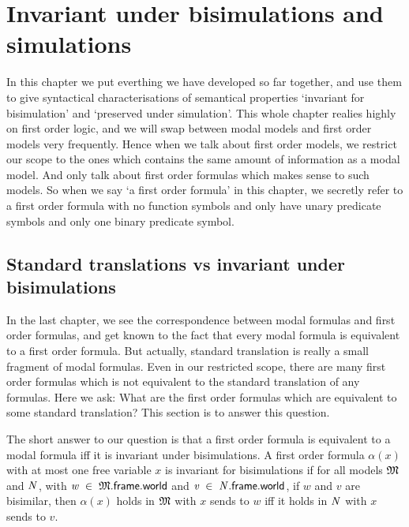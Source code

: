 \documentclass[letterpaper]{article}
\renewcommand{\HOLinline}[1]{\ensuremath{#1}}
\begin{document}
\section{Invariant under bisimulations and simulations}

In this chapter we put everthing we have developed so far together, and use them to give syntactical characterisations of semantical properties `invariant for bisimulation' and `preserved under simulation'. This whole chapter realies highly on first order logic, and we will swap between modal models and first order models very frequently. Hence when we talk about first order models, we restrict our scope to the ones which contains the same amount of information as a modal model. And only talk about first order formulas which makes sense to such models. So when we say `a first order formula' in this chapter, we secretly refer to a first order formula with no function symbols and only have unary predicate symbols and only one binary predicate symbol.

\subsection{Standard translations vs invariant under bisimulations}

In the last chapter, we see the correspondence between modal formulas and first order formulas, and get known to the fact that every modal formula is equivalent to a first order formula. But actually, standard translation is really a small fragment of modal formulas. Even in our restricted scope, there are many first order formulas which is not equivalent to the standard translation of any formulas. Here we ask: What are the first order formulas which are equivalent to some standard translation? This section is to answer this question. 

The short answer to our question is that a first order formula is equivalent to a modal formula iff it is invariant under bisimulations. A first order formula $\alpha(x)$ with at most one free variable $x$ is invariant for bisimulations if for all models \HOLinline{\HOLFreeVar{\ensuremath{\mathfrak{M}}}} and \HOLinline{\HOLFreeVar{N}}, with \HOLinline{\HOLFreeVar{w}\;\HOLSymConst{\HOLTokenIn{}}\;\HOLFreeVar{\ensuremath{\mathfrak{M}}}.\HOLFieldName{frame}.\HOLFieldName{world}} and \HOLinline{\HOLFreeVar{v}\;\HOLSymConst{\HOLTokenIn{}}\;\HOLFreeVar{N}.\HOLFieldName{frame}.\HOLFieldName{world}}, if $w$ and $v$ are bisimilar, then $\alpha(x)$ holds in \HOLinline{\HOLFreeVar{\ensuremath{\mathfrak{M}}}} with $x$ sends to $w$ iff it holds in \HOLinline{\HOLFreeVar{N}} with $x$ sends to $v$. 
\end{document}
